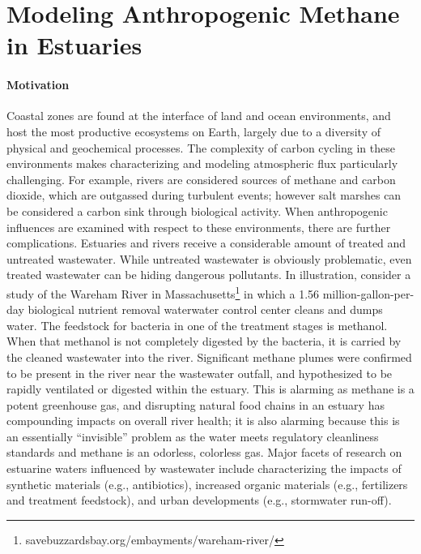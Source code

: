 \section{Modeling Anthropogenic Methane in Estuaries}
\paragraph{Motivation}
Coastal zones are found at the interface of land and ocean environments, and host the most productive ecosystems on Earth, largely due to a diversity of physical and geochemical processes.
The complexity of carbon cycling in these environments makes characterizing and modeling atmospheric flux particularly challenging.
For example, rivers are considered sources of methane and carbon dioxide, which are outgassed during turbulent events\autocite{cole2007plumbing, stanley2016ecology}; however salt marshes can be considered a carbon sink through biological activity\autocite{cai2011estuarine}.
When anthropogenic influences are examined with respect to these environments, there are further complications.
Estuaries and rivers receive a considerable amount of treated and untreated wastewater.
While untreated wastewater is obviously problematic, even treated wastewater can be hiding dangerous pollutants.
In illustration, consider a study of the Wareham River in Massachusetts\footnote{savebuzzardsbay.org/embayments/wareham-river/} in which a 1.56 million-gallon-per-day biological nutrient removal waterwater control center cleans and dumps water.
The feedstock for bacteria in one of the treatment stages is methanol. When that methanol is not completely digested by the bacteria, it is carried by the cleaned wastewater into the river. Significant methane plumes were confirmed to be present in the river near the wastewater outfall, and hypothesized to be rapidly ventilated or digested within the estuary\autocite{preston2019adaptive}.
This is alarming as methane is a potent greenhouse gas, and disrupting natural food chains in an estuary has compounding impacts on overall river health; it is also alarming because this is an essentially ``invisible'' problem as the water meets regulatory cleanliness standards and methane is an odorless, colorless gas.
Major facets of research on estuarine waters influenced by wastewater include characterizing the impacts of synthetic materials (e.g., antibiotics\autocite{roberts2006occurrence}), increased organic materials (e.g., fertilizers and treatment feedstock\autocite{valiela2016eutrophication}), and urban developments (e.g., stormwater run-off\autocite{geedicke2018urban}).


